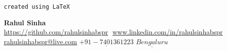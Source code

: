 \documentclass[letterpaper, 12pt]{article}
\begin{document}
	
	\begin{flushright}
		\texttt{created using {\LaTeX}}
	\end{flushright}
	\vspace*{-1cm}
	\begin{center}
		\textbf{\Huge Rahul Sinha} \\ \vspace{4pt}
		\href{https://github.com/rahulsinhabspr}{\underline{https://github.com/rahulsinhabspr}} $  $
		\href{www.linkedin.com/in/rahulsinhabspr}{\underline{www.linkedin.com/in/rahulsinhabspr}} $  $
		\href{mailto:rahulsinhabspr@live.com}
		{\underline{rahulsinhabspr@live.com}}
		\newline
		{$\underline{+91-7401361223}$}
		{$\underline{Bengaluru}$}
	\end{center}
	\vspace{-6cm}
\end{document}

